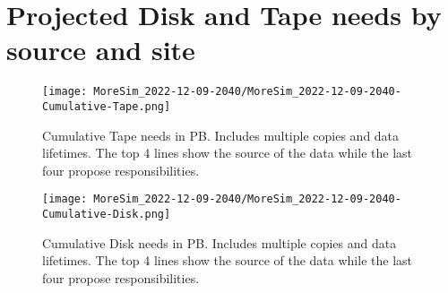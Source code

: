 \section{Projected Disk and Tape needs by source and site}
\begin{figure}[h]
\centering\texttt{[image: MoreSim\_2022-12-09-2040/MoreSim\_2022-12-09-2040-Cumulative-Tape.png]}
\caption{Cumulative Tape needs in PB. Includes multiple copies and data lifetimes. The top 4 lines show the source of the data while the last four propose responsibilities.}
\label{fig:Cumulative-Tape}
\end{figure}
\begin{figure}[h]
\centering\texttt{[image: MoreSim\_2022-12-09-2040/MoreSim\_2022-12-09-2040-Cumulative-Disk.png]}
\caption{Cumulative Disk needs in PB. Includes multiple copies and data lifetimes. The top 4 lines show the source of the data while the last four propose responsibilities.}
\label{fig:Cumulative-Disk}
\end{figure}
